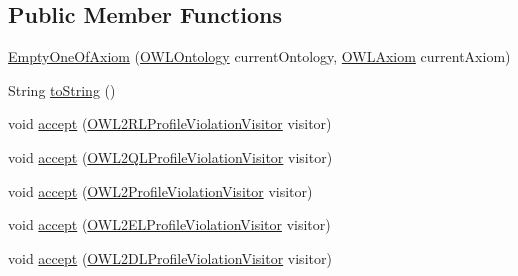 \subsection*{Public Member Functions}
\begin{DoxyCompactItemize}
\item 
\hyperlink{classorg_1_1semanticweb_1_1owlapi_1_1profiles_1_1_empty_one_of_axiom_a9e68c62d0faa739aede1672db302ae42}{Empty\-One\-Of\-Axiom} (\hyperlink{interfaceorg_1_1semanticweb_1_1owlapi_1_1model_1_1_o_w_l_ontology}{O\-W\-L\-Ontology} current\-Ontology, \hyperlink{interfaceorg_1_1semanticweb_1_1owlapi_1_1model_1_1_o_w_l_axiom}{O\-W\-L\-Axiom} current\-Axiom)
\item 
String \hyperlink{classorg_1_1semanticweb_1_1owlapi_1_1profiles_1_1_empty_one_of_axiom_ad4017498d0a9904ab2b517a2d7760a45}{to\-String} ()
\item 
void \hyperlink{classorg_1_1semanticweb_1_1owlapi_1_1profiles_1_1_empty_one_of_axiom_a29a2383e86e5497767cb7dd4ab0def5f}{accept} (\hyperlink{interfaceorg_1_1semanticweb_1_1owlapi_1_1profiles_1_1_o_w_l2_r_l_profile_violation_visitor}{O\-W\-L2\-R\-L\-Profile\-Violation\-Visitor} visitor)
\item 
void \hyperlink{classorg_1_1semanticweb_1_1owlapi_1_1profiles_1_1_empty_one_of_axiom_a7111591813fdd75d45836004d049eb3e}{accept} (\hyperlink{interfaceorg_1_1semanticweb_1_1owlapi_1_1profiles_1_1_o_w_l2_q_l_profile_violation_visitor}{O\-W\-L2\-Q\-L\-Profile\-Violation\-Visitor} visitor)
\item 
void \hyperlink{classorg_1_1semanticweb_1_1owlapi_1_1profiles_1_1_empty_one_of_axiom_acdb9029502afd4e0bcc85142c4a03ef5}{accept} (\hyperlink{interfaceorg_1_1semanticweb_1_1owlapi_1_1profiles_1_1_o_w_l2_profile_violation_visitor}{O\-W\-L2\-Profile\-Violation\-Visitor} visitor)
\item 
void \hyperlink{classorg_1_1semanticweb_1_1owlapi_1_1profiles_1_1_empty_one_of_axiom_ae140f7e672309c5a9e67af1c5ebe548f}{accept} (\hyperlink{interfaceorg_1_1semanticweb_1_1owlapi_1_1profiles_1_1_o_w_l2_e_l_profile_violation_visitor}{O\-W\-L2\-E\-L\-Profile\-Violation\-Visitor} visitor)
\item 
void \hyperlink{classorg_1_1semanticweb_1_1owlapi_1_1profiles_1_1_empty_one_of_axiom_a67ef21f2fd1c604e757de9b973e181bf}{accept} (\hyperlink{interfaceorg_1_1semanticweb_1_1owlapi_1_1profiles_1_1_o_w_l2_d_l_profile_violation_visitor}{O\-W\-L2\-D\-L\-Profile\-Violation\-Visitor} visitor)
\end{DoxyCompactItemize}


